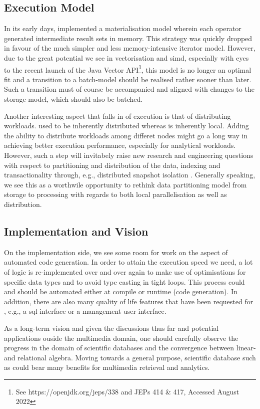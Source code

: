 \subsection{Execution Model}
In its early days, \cottontail{} implemented a materialisation model wherein each operator generated intermediate result sets in memory. This strategy was quickly dropped in favour of the much simpler and less memory-intensive iterator model. However, due to the great potential we see in vectorisation and \acrshort{simd}, especially with eyes to the recent launch of the Java Vector API\footnote{See https://openjdk.org/jeps/338 and JEPs 414 \& 417, Accessed August 2022}, this model is no longer an optimal fit and a transition to a batch-model should be realised rather sooner than later. Such a transition must of course be accompanied and aligned with changes to the storage model, which should also be batched.

Another interesting aspect that falls in of execution is that of distributing workloads. \adampro{} used to be inherently distributed \cite{Giangreco:2016Adam,Giangreco:2018Database} whereas \cottontail{} is inherently local. Adding the ability to distribute workloads among differet nodes might go a long way in achieving better execution performance, especially for analytical workloads. However, such a step will invitabely raise new research and engineering questions with respect to partitioning and distribution of the data, indexing and transactionality through, e.g., distributed snapshot isolation \cite{Binnig:2014Distributed}. Generally speaking, we see this as a worthwile opportunity to rethink \cottontail{} data partitioning model from storage to processing with regards to both local parallelisation as well as distribution.

\subsection{Implementation and Vision}
On the implementation side, we see some room for work on the aspect of automated code generation. In order to attain the execution speed we need, a lot of logic is re-implemented over and over again to make use of optimisations for specific data types and to avoid type casting in tight loops. This process could and should be automated either at compile or runtime (code generation). In addition, there are also many quality of life features that have been requested for \cottontail{}, e.g., a \acrshort{sql} interface or a management user interface.

As a long-term vision and given the discussions thus far and potential applications ouside the multimedia domain, one should carefully observe the progress in the domain of scientific databases and the convergence between linear- and relational algebra. Moving towards a general purpose, scientific database such as \cite{Stonebraker:2013SciDB,Luo:2018Scalable,Blacher:2022Machine} could bear many benefits  for multimedia retrieval and analytics.